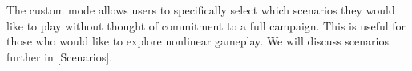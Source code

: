 
The custom mode allows users to specifically select which scenarios they would like to play without thought of commitment to a full campaign. This is useful for those who would like to explore nonlinear gameplay. We will discuss scenarios further in [Scenarios].


